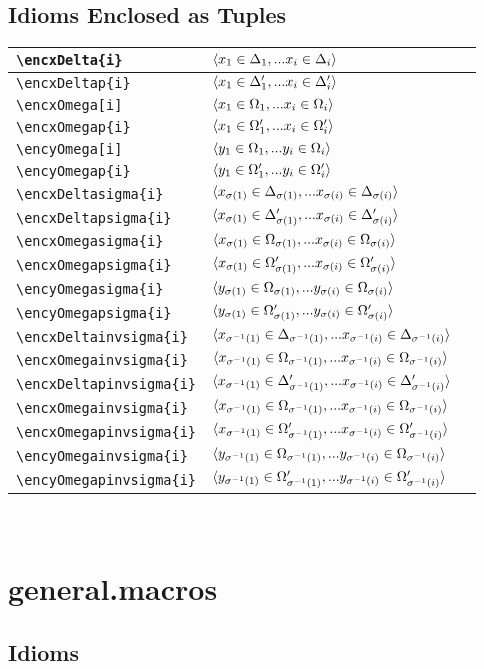 \documentclass[10pt,a4paper]{article}
\begin{document}
\subsection{Idioms Enclosed as Tuples}
\begin{tabular}{| l | l |p{3cm}|}
\hline
\verb!\encxDelta{i}! & $\encxDelta{i}$&\\
 \hline
\verb!\encxDeltap{i}! & $\encxDeltap{i}$&\\
 \hline
\verb!\encxOmega[i]! & $\encxOmega{i}$&\\
 \hline
\verb!\encxOmegap{i}! & $\encxOmegap{i}$&\\
 \hline
\verb!\encyOmega[i]! & $\encyOmega{i}$&\\
 \hline
\verb!\encyOmegap{i}! & $\encyOmegap{i}$&\\
 \hline
\hline
\verb!\encxDeltasigma{i}! & $\encxDeltasigma{i}$&\\
\hline
\verb!\encxDeltapsigma{i}! & $\encxDeltapsigma{i}$&\\
 \hline
\verb!\encxOmegasigma{i}! & $\encxOmegasigma{i}$&\\
 \hline
\verb!\encxOmegapsigma{i}! & $\encxOmegapsigma{i}$&\\
 \hline
\verb!\encyOmegasigma{i}! & $\encyOmegasigma{i}$&\\
 \hline
\verb!\encyOmegapsigma{i}! & $\encyOmegapsigma{i}$&\\
 \hline
\hline
\verb!\encxDeltainvsigma{i}! & $\encxDeltainvsigma{i}$&\\
 \hline
\verb!\encxOmegainvsigma{i}! & $\encxOmegainvsigma{i}$&\\
\hline
\verb!\encxDeltapinvsigma{i}! & $\encxDeltapinvsigma{i}$&\\
 \hline
\verb!\encxOmegainvsigma{i}! & $\encxOmegainvsigma{i}$&\\
 \hline
\verb!\encxOmegapinvsigma{i}! & $\encxOmegapinvsigma{i}$&\\
 \hline
\verb!\encyOmegainvsigma{i}! & $\encyOmegainvsigma{i}$&\\
 \hline
\verb!\encyOmegapinvsigma{i}! & $\encyOmegapinvsigma{i}$&\\
 \hline
\end{tabular} \\

\section {general.macros}

\subsection{Idioms}
\end{document}
